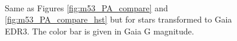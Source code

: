 \documentclass[]{spie}  %
\begin{document}
\begin{figure}[!h]
  \centering
  \\
  \hspace{-1cm}
  \caption{Same as Figures \ref{fig:m53_PA_compare} and \ref{fig:m53_PA_compare_hst} but for stars transformed to Gaia EDR3. The color bar is given in Gaia G magnitude.} \label{fig:m53_PA_compare_gaia}
\end{figure}
\end{document}
